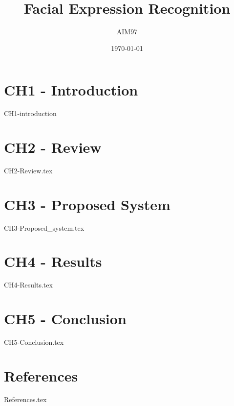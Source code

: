 \documentclass[a4paper]{book}
\title{Facial Expression Recognition}
\author{AIM97}
\date{\today}
\begin{document}
	\maketitle
	\tableofcontents
	\chapter{CH1 - Introduction}
	{CH1-introduction}
	
	\chapter{CH2 - Review}
	{CH2-Review.tex}
	
	\chapter{CH3 - Proposed System}
	{CH3-Proposed_system.tex}
	
	\chapter{CH4 - Results}
	{CH4-Results.tex}
	
	\chapter{CH5 - Conclusion}
	{CH5-Conclusion.tex}
	
	\chapter{References}
	{References.tex}
	
\end{document}
